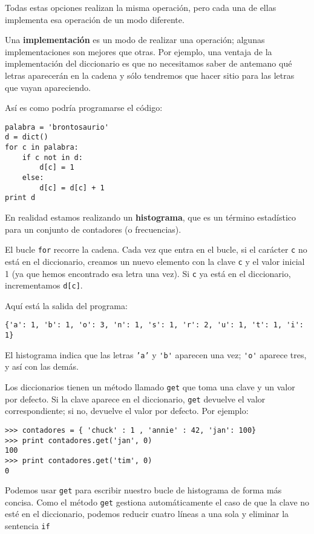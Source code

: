 Todas estas opciones realizan la misma operación, pero cada
una de ellas implementa esa operación de un modo diferente.


Una {\bf implementación} es un modo de realizar una operación;
algunas implementaciones son mejores que otras. Por ejemplo,
una ventaja de la implementación del diccionario es que no
necesitamos saber de antemano qué letras aparecerán en la cadena
y sólo tendremos que hacer sitio para las letras que vayan apareciendo.

Así es como podría programarse el código:

\beforeverb
\begin{verbatim}
palabra = 'brontosaurio'
d = dict()
for c in palabra:
    if c not in d:
        d[c] = 1
    else:
        d[c] = d[c] + 1
print d
\end{verbatim}
\afterverb
%
En realidad estamos realizando un {\bf histograma}, que es un término
estadístico para un conjunto de contadores (o frecuencias).


El bucle {\tt for} recorre
la cadena. Cada vez que entra en el bucle, si el carácter {\tt c} no
está en el diccionario, creamos un nuevo elemento con la clave {\tt c} y el
valor inicial 1 (ya que hemos encontrado esa letra una vez). Si {\tt c} ya
está en el diccionario, incrementamos {\tt d[c]}.

Aquí está la salida del programa:

\beforeverb
\begin{verbatim}
{'a': 1, 'b': 1, 'o': 3, 'n': 1, 's': 1, 'r': 2, 'u': 1, 't': 1, 'i': 1}
\end{verbatim}
\afterverb
%
El histograma indica que las letras {\tt 'a'} y \verb"'b'"
aparecen una vez;  \verb"'o'" aparece tres, y así con las demás.


Los diccionarios tienen un método llamado {\tt get} que toma una clave
y un valor por defecto. Si la clave aparece en el diccionario,
{\tt get} devuelve el valor correspondiente; si no, devuelve
el valor por defecto. Por ejemplo:

\beforeverb
\begin{verbatim}
>>> contadores = { 'chuck' : 1 , 'annie' : 42, 'jan': 100}
>>> print contadores.get('jan', 0)
100
>>> print contadores.get('tim', 0)
0
\end{verbatim}
\afterverb
%
Podemos usar {\tt get} para escribir nuestro bucle de histograma de forma más concisa.
Como el método {\tt get} gestiona automáticamente el caso de que la clave
no esté en el diccionario, podemos reducir cuatro líneas a una sola
y eliminar la sentencia {\tt if}

